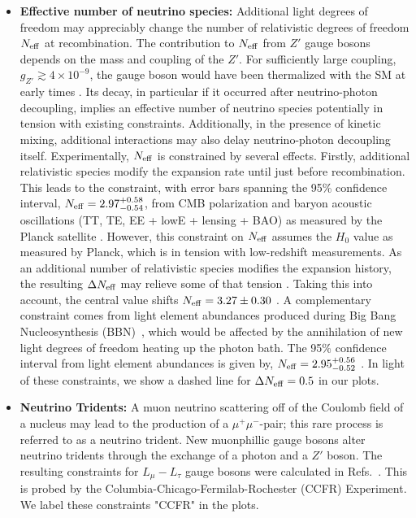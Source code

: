 \documentclass[11pt]{article}
\begin{document}
\begin{itemize}
\item {\bf Effective number of neutrino species:} Additional light degrees of freedom may appreciably change the number of relativistic degrees of freedom $N_{\rm eff}$ at recombination.
The contribution to $N_{\rm eff}$ from $Z'$ gauge bosons depends on the mass and coupling of the $Z'$. For sufficiently large coupling, $g_{Z'} \gtrsim 4 \times 10^{-9}$, the gauge boson would have been thermalized with the SM at early times \cite{Escudero:2019gzq}. Its decay, in particular if it occurred after neutrino-photon decoupling, implies an effective number of neutrino species potentially in tension with existing constraints. Additionally, in the presence of kinetic mixing, additional interactions may also delay neutrino-photon decoupling itself. Experimentally, $N_{\rm eff}$ is constrained by several effects. Firstly, additional relativistic species modify the expansion rate until just before recombination. This leads to the constraint, with error bars spanning the 95\% confidence interval, $N_{\rm eff} =  2.97^{+0.58}_{
-0.54}$, from CMB polarization and baryon acoustic oscillations (TT, TE, EE + lowE + lensing + BAO) as measured by the Planck satellite \cite{Aghanim:2018eyx}.
However, this constraint on $N_{\rm eff}$ assumes the $H_0$ value as measured by Planck, which is in tension with low-redshift measurements.
As an additional number of relativistic species modifies the expansion history, the resulting $\Delta N_{\rm eff}$ may relieve some of that tension \cite{Bernal:2016gxb,DEramo:2018vss}.
Taking this into account, the central value shifts
$N_{\rm eff} = 3.27 \pm 0.30$ \cite{Aghanim:2018eyx}.
A complementary constraint comes from light element abundances produced during Big Bang Nucleosynthesis (BBN)~\cite{ Boehm:2012gr}, which would be affected by the annihilation of new light degrees of freedom heating up the photon bath. The 95\% confidence interval from light element abundances is given by,
$N_{\rm eff} =  2.95^{+0.56}_{-0.52}$ \cite{Aghanim:2018eyx}. In light of these constraints, we show a dashed line for $\Delta N_{\rm eff}=0.5$ in our plots.
\item {\bf Neutrino Tridents:} 
A muon neutrino scattering off of the Coulomb field of a nucleus may lead to the production of a $\mu^+\mu^-$-pair; this rare process is referred to as a neutrino trident. 
New muonphillic gauge bosons alter neutrino tridents through the exchange of a photon and a $Z'$ boson. 
The resulting constraints for $L_\mu-L_\tau$ gauge bosons were calculated in Refs.~\cite{Altmannshofer:2014pba,PhysRevLett.66.3117}. This is probed by the Columbia-Chicago-Fermilab-Rochester (CCFR) Experiment. We label these constraints "CCFR" in the plots. 


\end{itemize}
\end{document}
